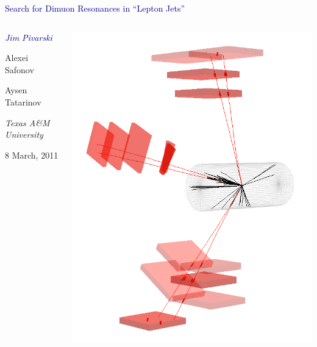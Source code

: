 \documentclass[compress]{beamer}
\begin{document}
\begin{frame}
\vfill
\begin{center}
\textcolor{darkblue}{\Large Search for Dimuon Resonances in ``Lepton Jets''}

\vfill
\begin{columns}
\begin{center}
\large
\textcolor{darkblue}{\it Jim Pivarski}

Alexei Safonov

Aysen Tatarinov

\vspace{0.5 cm}
\scriptsize
{\it Texas A\&M University}

\vspace{0.5 cm}
\normalsize
8 March, 2011
\end{center}

\includegraphics[width=\linewidth]{eventdisplay_3d.png}
\end{columns}

\end{center}
\end{frame}
\end{document}

